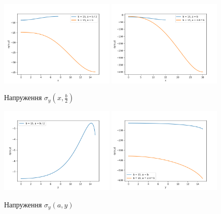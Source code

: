 \begin{figure}[h!]
    \begin{center}
        \includegraphics[width=0.49\textwidth, scale=1]{images/results/static_1/sigma_y(x,b:2)1.png}
        \includegraphics[width=0.49\textwidth, scale=1]{images/results/static_1/sigma_y(x,b:2)2.png}
        \caption{Напруження $\sigma_y(x, \frac{b}{2})$}\label{static_1_sigma_y(x,b:2)}
    \end{center}
\end{figure}

\begin{figure}[h!]
    \begin{center}
        \includegraphics[width=0.49\textwidth, scale=1]{images/results/static_1/sigma_y(a,y)1.png}
        \includegraphics[width=0.49\textwidth, scale=1]{images/results/static_1/sigma_y(a,y)2.png}
        \caption{Напруження $\sigma_y(a, y)$}\label{static_1_sigma_y(a,y)}
    \end{center}
\end{figure}

